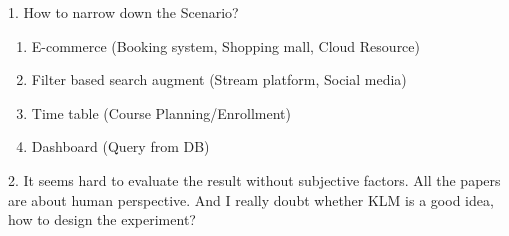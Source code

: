 
1. How to narrow down the Scenario?

\begin{enumerate}
    \item E-commerce (Booking system, Shopping mall, Cloud Resource)
    \item Filter based search augment (Stream platform, Social media)
    \item Time table (Course Planning/Enrollment)
    \item Dashboard (Query from DB)
    
\end{enumerate}

2. It seems hard to evaluate the result without subjective factors. All the papers are about human perspective.
And I really doubt whether KLM is a good idea, how to design the experiment?


